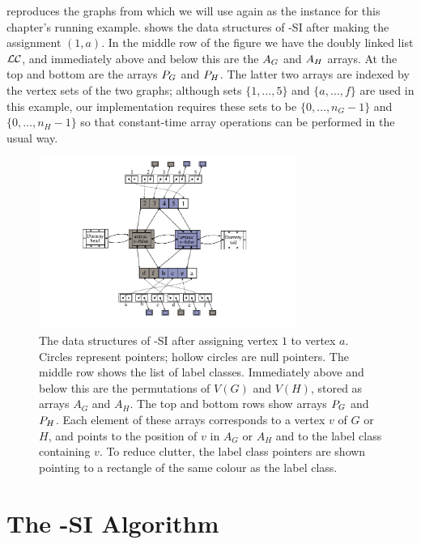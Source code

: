  reproduces the graphs from
 which we will use again as the instance for this
chapter's running example.   shows the data
structures of \McSplit-SI after making the assignment $(1,a)$.  In the middle
row of the figure we have the doubly linked list $\mathcal{LC}$, and immediately
above and below this are the $A_G$ and $A_H$ arrays.  At the top and
bottom are the arrays $P_G$ and $P_H$.  The latter two arrays are indexed
by the vertex sets of the two graphs; although sets $\{1,\dots,5\}$ and
$\{a,\dots,f\}$ are used in this example, our implementation requires these sets to be
$\{0, \dots, n_G-1\}$ and $\{0, \dots, n_H-1\}$ so that constant-time array
operations can be performed in the usual way.


\begin{figure}[htb]
    \centering
    \includegraphics*[width=0.75\textwidth]{14b-mcsplit-induced-si/figs/data-structure-step-1}
    \caption{The data structures of \McSplit-SI after assigning vertex $1$ to vertex $a$.
        Circles represent pointers; hollow circles are null pointers.  The middle row shows
        the list of label classes.  Immediately above and below this are the
        permutations of $V(G)$ and $V(H)$, stored as arrays $A_G$ and $A_H$.  The top and bottom rows
        show arrays $P_G$ and $P_H$.  Each element of these arrays
        corresponds to a vertex $v$ of $G$ or $H$, and points to the position of $v$ in
        $A_G$ or $A_H$ and to the label class containing $v$.  To reduce clutter,
        the label class pointers are shown pointing to a rectangle of the same colour as the
        label class.}
    \label{figure:si-data-structures}
\end{figure}

\FloatBarrier

\section{The \McSplit-SI Algorithm}\label{sec:mcsplit-si-algorithm}

